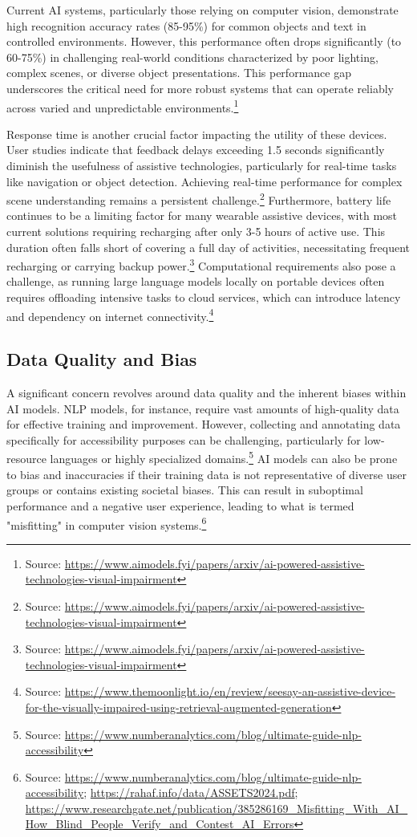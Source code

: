 Current AI systems, particularly those relying on computer vision, demonstrate high recognition accuracy rates (85-95\%) for common objects and text in controlled environments. However, this performance often drops significantly (to 60-75\%) in challenging real-world conditions characterized by poor lighting, complex scenes, or diverse object presentations. This performance gap underscores the critical need for more robust systems that can operate reliably across varied and unpredictable environments.\footnote{Source: \url{https://www.aimodels.fyi/papers/arxiv/ai-powered-assistive-technologies-visual-impairment}}

Response time is another crucial factor impacting the utility of these devices. User studies indicate that feedback delays exceeding 1.5 seconds significantly diminish the usefulness of assistive technologies, particularly for real-time tasks like navigation or object detection. Achieving real-time performance for complex scene understanding remains a persistent challenge.\footnote{Source: \url{https://www.aimodels.fyi/papers/arxiv/ai-powered-assistive-technologies-visual-impairment}} Furthermore, battery life continues to be a limiting factor for many wearable assistive devices, with most current solutions requiring recharging after only 3-5 hours of active use. This duration often falls short of covering a full day of activities, necessitating frequent recharging or carrying backup power.\footnote{Source: \url{https://www.aimodels.fyi/papers/arxiv/ai-powered-assistive-technologies-visual-impairment}} Computational requirements also pose a challenge, as running large language models locally on portable devices often requires offloading intensive tasks to cloud services, which can introduce latency and dependency on internet connectivity.\footnote{Source: \url{https://www.themoonlight.io/en/review/seesay-an-assistive-device-for-the-visually-impaired-using-retrieval-augmented-generation}}

\subsection{Data Quality and Bias}

A significant concern revolves around data quality and the inherent biases within AI models. NLP models, for instance, require vast amounts of high-quality data for effective training and improvement. However, collecting and annotating data specifically for accessibility purposes can be challenging, particularly for low-resource languages or highly specialized domains.\footnote{Source: \url{https://www.numberanalytics.com/blog/ultimate-guide-nlp-accessibility}} AI models can also be prone to bias and inaccuracies if their training data is not representative of diverse user groups or contains existing societal biases. This can result in suboptimal performance and a negative user experience, leading to what is termed "misfitting" in computer vision systems.\footnote{Source: \url{https://www.numberanalytics.com/blog/ultimate-guide-nlp-accessibility}; \url{https://rahaf.info/data/ASSETS2024.pdf}; \url{https://www.researchgate.net/publication/385286169_Misfitting_With_AI_How_Blind_People_Verify_and_Contest_AI_Errors}}

